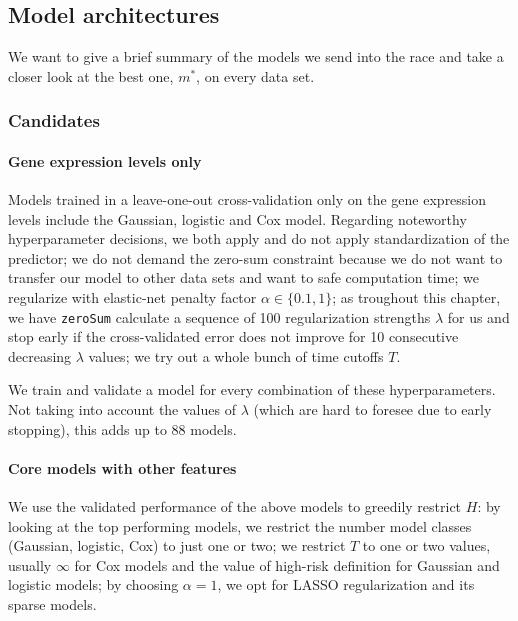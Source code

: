 

\subsection{Model architectures}

We want to give a brief summary of the models we send into the race and take a closer look at the 
best one, $m^*$, on every data set.

\subsubsection{Candidates}

\paragraph{Gene expression levels only}
Models trained in a leave-one-out cross-validation only on the gene expression levels include the 
Gaussian, logistic and Cox model. Regarding noteworthy hyperparameter decisions, we both apply and 
do not apply standardization of the predictor; we do not demand the zero-sum constraint 
because we do not want to transfer our model to other data sets and want to safe computation time;
we regularize with elastic-net penalty factor $\alpha \in \{ \num{0.1}, 1 \}$; as troughout this 
chapter, we have \texttt{zeroSum} calculate a sequence of \num{100} regularization strengths 
$\lambda$ for us and stop early if the cross-validated error does not improve for \num{10} 
consecutive decreasing $\lambda$ values; we try out a whole bunch of time cutoffs $T$.

We train and validate a model for every combination of these hyperparameters.
Not taking into account the values of $\lambda$ (which are hard to foresee due to early stopping), 
this adds up to \num{88} models.

\paragraph{Core models with other features}
We use the validated performance of the above models to greedily restrict $H$: by looking at the 
top performing models, we restrict the number model classes (Gaussian, logistic, Cox) to just one 
or two; we restrict $T$ to one or two values, usually $\infty$ for Cox models and the value 
of high-risk definition for Gaussian and logistic models; by choosing $\alpha = 1$, we opt for 
LASSO regularization and its sparse models. 

